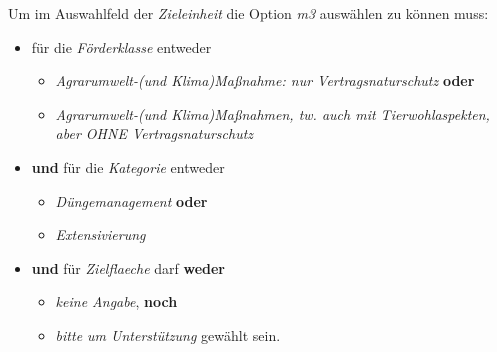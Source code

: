 \documentclass[12pt, twoside
   DIV10,
   parskip=full, %
   listof=totoc, %
   bibliography=totoc, %
   index=totoc, %
  ]{scrbook}
\begin{document}
Um im Auswahlfeld der \textit{Zieleinheit} die Option \textit{m3} auswählen zu können muss:
\begin{itemize}
  \item für die \textit{Förderklasse} entweder
        \begin{itemize}
          \item \textit{Agrarumwelt-(und Klima)Maßnahme: nur Vertragsnaturschutz} \textbf{oder}
          \item \textit{Agrarumwelt-(und Klima)Maßnahmen, tw. auch mit Tierwohlaspekten, aber OHNE Vertragsnaturschutz}
        \end{itemize}
  \item \textbf{und} für die \textit{Kategorie} entweder
        \begin{itemize}
          \item \textit{Düngemanagement} \textbf{oder}
          \item \textit{Extensivierung}
        \end{itemize}
  \item \textbf{und} für \textit{Zielflaeche} darf \textbf{weder}
        \begin{itemize}
          \item \textit{keine Angabe}, \textbf{noch}
          \item \textit{bitte um Unterstützung} gewählt sein.
        \end{itemize}
\end{itemize}
\end{document}
